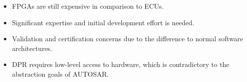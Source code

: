 \begin{itemize}
\item \glspl{FPGA} are still expensive in comparison to \glspl{ECU}.
\item Significant expertise and initial development effort is needed.
\item Validation and certification concerns due to the difference to normal software architectures.
\item \gls{DPR} requires low-level access to hardware, which is contradictory to the abstraction goals of \gls{AUTOSAR}.
\end{itemize}
